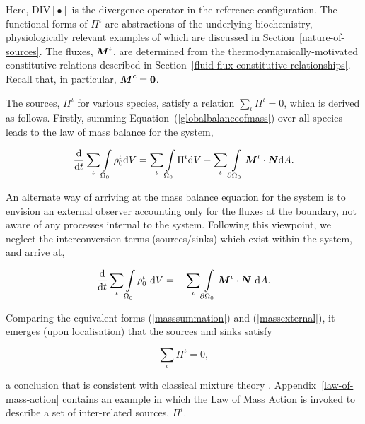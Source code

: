 \noindent Here, $\mathrm{DIV[\bullet]}$ is the divergence
operator in the reference configuration. The functional forms of
$\Pi^\iota$ are abstractions of the underlying biochemistry,
physiologically relevant examples of which are discussed in
Section~\ref{nature-of-sources}. The fluxes, $\mbox{\boldmath$ M$}^\iota$, are
determined from the thermodynamically-motivated constitutive relations
described in
Section~\ref{fluid-flux-constitutive-relationships}. Recall that, in
particular, $\mbox{\boldmath$ M$}^{c} = {\bf 0}$.

The sources, $\Pi^\iota$ for various species, satisfy a relation
$\sum\limits_\iota\Pi^\iota = 0$, which is derived as
follows. Firstly, summing Equation~(\ref{globalbalanceofmass}) over
all species leads to the law of mass balance for the system,

\begin{equation}
\frac{\mathrm{d}}{\mathrm{d}t} \sum\limits_\iota\int\limits_{\Omega_0}
\rho_0^\iota \mathrm{d}V = \sum\limits_\iota 
\int\limits_{\Omega_0} \Pi^\iota \mathrm{d}V
- \sum\limits_\iota \int\limits_{\partial\Omega_0}\mbox{\boldmath$ M$}^\iota\cdot\mbox{\boldmath$ N$}
\mathrm{d}A. 
\label{masssummation}
\end{equation}

\noindent An alternate way of arriving at the mass balance equation
for the system is to envision an external observer accounting only for
the fluxes at the boundary, not aware of any processes internal to the
system. Following this viewpoint, we neglect the interconversion terms
(sources/sinks) which exist within the system, and arrive at,

\begin{equation}
\frac{\mathrm{d}}{\mathrm{d}t}\sum\limits_\iota
\int\limits_{\Omega_0}\rho_0^\iota \ \mathrm{d}V =
-\sum\limits_\iota\int\limits_{\partial\Omega_0}\mbox{\boldmath$ M$}^\iota\cdot\mbox{\boldmath$ N$}
\ \mathrm{d}A.
\label{massexternal}
\end{equation}

\noindent Comparing the equivalent forms (\ref{masssummation})
and (\ref{massexternal}), it emerges (upon localisation) that the
sources and sinks satisfy

\begin{equation}
\sum\limits_\iota\Pi^\iota = 0,
\label{masssummationresult}
\end{equation}

\noindent a conclusion that is consistent with classical mixture
theory \citep{TruesdellNoll:65}. Appendix~\ref{law-of-mass-action}
contains an example in which the Law of Mass Action is invoked to
describe a set of inter-related sources, $\Pi^\iota$.

